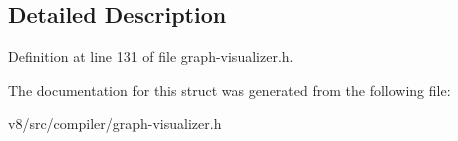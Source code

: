 \subsection{Detailed Description}


Definition at line 131 of file graph-\/visualizer.\+h.



The documentation for this struct was generated from the following file\+:\begin{DoxyCompactItemize}
\item 
v8/src/compiler/graph-\/visualizer.\+h\end{DoxyCompactItemize}
